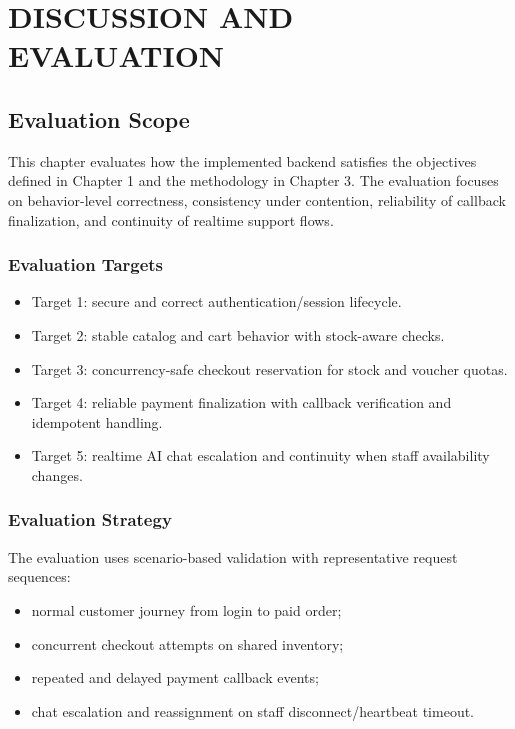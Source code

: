 \chapter{DISCUSSION AND EVALUATION}
\label{ch:discussion-evaluation}

\section{Evaluation Scope}

This chapter evaluates how the implemented backend satisfies the objectives defined in Chapter 1 and the methodology in Chapter 3. The evaluation focuses on behavior-level correctness, consistency under contention, reliability of callback finalization, and continuity of realtime support flows.

\subsection{Evaluation Targets}

\begin{itemize}
    \item Target 1: secure and correct authentication/session lifecycle.
    \item Target 2: stable catalog and cart behavior with stock-aware checks.
    \item Target 3: concurrency-safe checkout reservation for stock and voucher quotas.
    \item Target 4: reliable payment finalization with callback verification and idempotent handling.
    \item Target 5: realtime AI chat escalation and continuity when staff availability changes.
\end{itemize}

\subsection{Evaluation Strategy}

The evaluation uses scenario-based validation with representative request sequences:
\begin{itemize}
    \item normal customer journey from login to paid order;
    \item concurrent checkout attempts on shared inventory;
    \item repeated and delayed payment callback events;
    \item chat escalation and reassignment on staff disconnect/heartbeat timeout.
\end{itemize}

